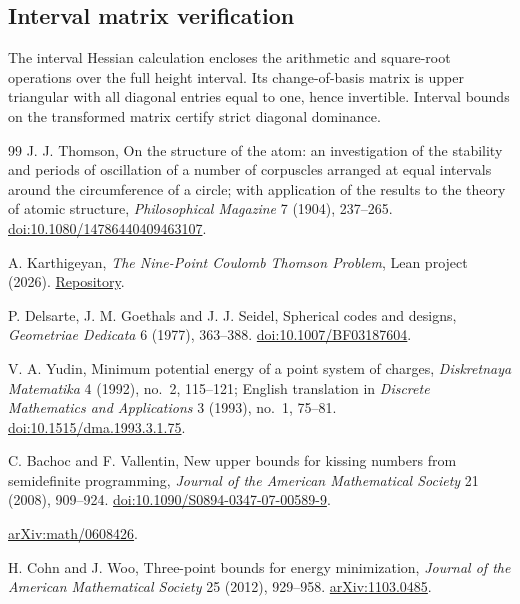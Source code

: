 \documentclass[11pt]{article}
\begin{document}
\begin{appendices}
\subsection{Interval matrix verification}\label{app:local}
The interval Hessian calculation encloses the arithmetic and square-root
operations over the full height interval. Its change-of-basis matrix is
upper triangular with all diagonal entries equal to one, hence invertible.
Interval bounds on the transformed matrix certify strict diagonal
dominance.

\end{appendices}
\clearpage
\begingroup\raggedright
\begin{thebibliography}{99}
\small
{}
J. J. Thomson, On the structure of the atom: an investigation of the
stability and periods of oscillation of a number of corpuscles arranged
at equal intervals around the circumference of a circle; with application
of the results to the theory of atomic structure,
\emph{Philosophical Magazine} 7 (1904), 237--265.
\href{https://doi.org/10.1080/14786440409463107}{doi:10.1080/14786440409463107}.

A. Karthigeyan, \emph{The Nine-Point Coulomb
Thomson Problem}, Lean project (2026).
\href{https://github.com/aravindkarthigeyan/thomson-n9-lean/tree/168ff0c98cab4dfda0460ba55f8d169070ac385e}{Repository}.

P. Delsarte, J. M. Goethals and J. J. Seidel, Spherical codes and designs,
\emph{Geometriae Dedicata} 6 (1977), 363--388.
\href{https://doi.org/10.1007/BF03187604}{doi:10.1007/BF03187604}.

V. A. Yudin, Minimum potential energy of a point system of charges,
\emph{Diskretnaya Matematika} 4 (1992), no.~2, 115--121;
English translation in \emph{Discrete Mathematics and Applications}
3 (1993), no.~1, 75--81.
\href{https://doi.org/10.1515/dma.1993.3.1.75}{doi:10.1515/dma.1993.3.1.75}.

C. Bachoc and F. Vallentin, New upper bounds for kissing numbers from
semidefinite programming, \emph{Journal of the American Mathematical
Society} 21 (2008), 909--924.
\href{https://doi.org/10.1090/S0894-0347-07-00589-9}{doi:10.1090/S0894-0347-07-00589-9}.

\href{https://arxiv.org/abs/math/0608426v4}{arXiv:math/0608426}.

H. Cohn and J. Woo, Three-point bounds for energy minimization,
\emph{Journal of the American Mathematical Society} 25 (2012), 929--958.
\href{https://arxiv.org/abs/1103.0485v2}{arXiv:1103.0485}.



\end{thebibliography}
\end{document}
